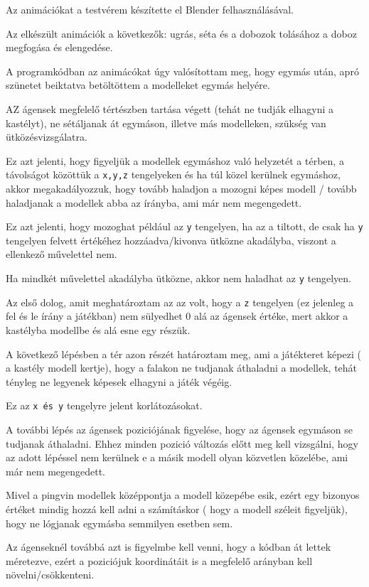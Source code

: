 Az animációkat a testvérem készítette el Blender felhasználásával. 

Az elkészült animációk a következők: ugrás, séta és a dobozok tolásához a doboz megfogása és elengedése.
 
A programkódban az animácókat úgy valósítottam meg, hogy egymás után, apró szünetet beiktatva betöltöttem a modelleket egymás helyére.
 

AZ ágensek megfelelő tértészben tartása végett (tehát ne tudják elhagyni a kastélyt), ne sétáljanak át egymáson, illetve más modelleken, szükség van ütközésvizsgálatra.

Ez azt jelenti, hogy figyeljük a modellek egymáshoz való helyzetét a térben, a távolságot közöttük a \texttt{x,y,z} tengelyeken és ha túl közel kerülnek egymáshoz, akkor megakadályozzuk, hogy tovább haladjon a mozogni képes modell / tovább haladjanak a modellek abba az írányba, ami már nem megengedett.

Ez azt jelenti, hogy  mozoghat  például az \texttt{y} tengelyen, ha az a tiltott, de csak ha \texttt{y} tengelyen felvett értékéhez hozzáadva/kivonva ütközne akadályba, viszont a ellenkező művelettel nem. 

Ha mindkét művelettel akadályba ütközne, akkor nem haladhat az \texttt{y} tengelyen.
 
Az első dolog, amit meghatároztam az az volt, hogy a \texttt{z} tengelyen (ez jelenleg a fel és le írány a játékban) nem sülyedhet 0 alá az ágensek értéke, mert akkor a kastélyba modellbe és alá esne egy részük.

A következő lépésben a tér azon részét határoztam meg, ami a játékteret képezi ( a kastély modell kertje), hogy a falakon ne tudjanak áthaladni a modellek, tehát tényleg ne legyenek képesek elhagyni a játék végéig.

Ez az \texttt{x és y} tengelyre jelent korlátozásokat.

A további lépés az ágensek poziciójának figyelése, hogy az ágensek egymáson se tudjanak áthaladni. Ehhez minden pozició változás előtt meg kell vizsgálni, hogy az adott lépéssel nem kerülnek e a másik modell olyan közvetlen közelébe, ami már nem megengedett.

Mivel a pingvin modellek középpontja a modell közepébe esik, ezért egy bizonyos értéket mindig hozzá kell adni a számításkor ( hogy a modell széleit figyeljük), hogy ne lógjanak egymásba semmilyen esetben sem. 

Az ágenseknél továbbá azt is figyelmbe kell venni, hogy a kódban át lettek méretezve, ezért a poziciójuk koordinátáit is a megfelelő arányban kell növelni/csökkenteni.

